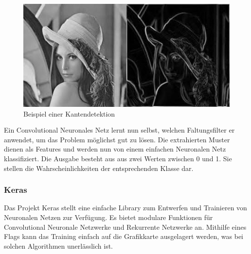 \begin{figure}[H]
	\centering
	\includegraphics{images/kantendetektion.jpg}
	\caption{Beispiel einer Kantendetektion}
\end{figure}
Ein Convolutional Neuronales Netz lernt nun selbst, welchen Faltungsfilter er anwendet, um das Problem möglichst gut zu lösen. Die extrahierten Muster dienen als Features und werden nun von einem einfachen Neuronalen Netz klassifiziert. Die Ausgabe besteht aus aus zwei Werten zwischen 0 und 1. Sie stellen die Wahrscheinlichkeiten der entsprechenden Klasse dar.

\subsubsection{Keras}
Das Projekt \Gls{Keras} \cite{Keras} stellt eine einfache Library zum Entwerfen und Trainieren von Neuronalen Netzen zur Verfügung. Es bietet modulare Funktionen für Convolutional Neuronale Netzwerke und Rekurrente Netzwerke an. Mithilfe eines Flags kann das Training einfach auf die Grafikkarte ausgelagert werden, was bei solchen Algorithmen unerlässlich ist.
\newpage